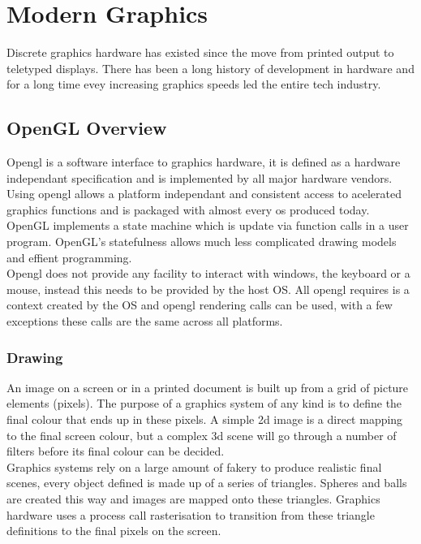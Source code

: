 \section{Modern Graphics}
Discrete graphics hardware has existed since the move from printed output to 
teletyped displays. There has been a long history of development in hardware and
for a long time evey increasing graphics speeds led the entire tech industry.\\

\subsection{OpenGL Overview} 
Opengl is a software interface to graphics hardware, it is defined as a hardware
independant specification and is implemented by all major hardware vendors.
Using opengl allows a platform independant and consistent access to acelerated 
graphics functions and is packaged with almost every os produced today.\\

OpenGL implements a state machine which is update via function calls in a user
program. OpenGL's statefulness allows much less complicated drawing models and
effient programming. \\

Opengl does not provide any facility to interact with windows, the keyboard or a 
mouse, instead this needs to be provided by the host OS. All opengl requires is 
a context created by the OS and opengl rendering calls can be used, with a few 
exceptions these calls are the same across all platforms.\\

\subsubsection*{Drawing}
An image on a screen or in a printed document is built up from a grid of picture
elements (pixels). The purpose of a graphics system of any kind is to define the
final colour that ends up in these pixels. A simple 2d image is a direct mapping
to the final screen colour, but a complex 3d scene will go through a number of 
filters before its final colour can be decided. \\

Graphics systems rely on a large amount of fakery to produce realistic final 
scenes, every object defined is made up of a series of triangles. Spheres and
balls are created this way and images are mapped onto these triangles. Graphics
hardware uses a process call rasterisation to transition from these triangle 
definitions to the final pixels on the screen.\\

